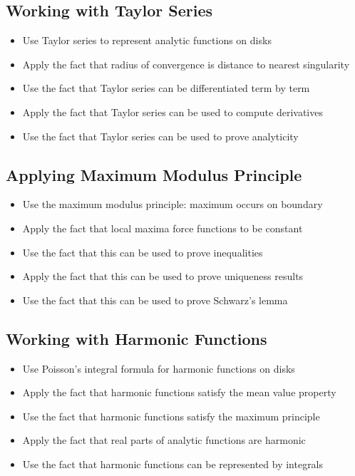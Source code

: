 \subsection*{Working with Taylor Series}
\begin{itemize}
\item Use Taylor series to represent analytic functions on disks
\item Apply the fact that radius of convergence is distance to nearest singularity
\item Use the fact that Taylor series can be differentiated term by term
\item Apply the fact that Taylor series can be used to compute derivatives
\item Use the fact that Taylor series can be used to prove analyticity
\end{itemize}

\subsection*{Applying Maximum Modulus Principle}
\begin{itemize}
\item Use the maximum modulus principle: maximum occurs on boundary
\item Apply the fact that local maxima force functions to be constant
\item Use the fact that this can be used to prove inequalities
\item Apply the fact that this can be used to prove uniqueness results
\item Use the fact that this can be used to prove Schwarz's lemma
\end{itemize}

\subsection*{Working with Harmonic Functions}
\begin{itemize}
\item Use Poisson's integral formula for harmonic functions on disks
\item Apply the fact that harmonic functions satisfy the mean value property
\item Use the fact that harmonic functions satisfy the maximum principle
\item Apply the fact that real parts of analytic functions are harmonic
\item Use the fact that harmonic functions can be represented by integrals
\end{itemize}

